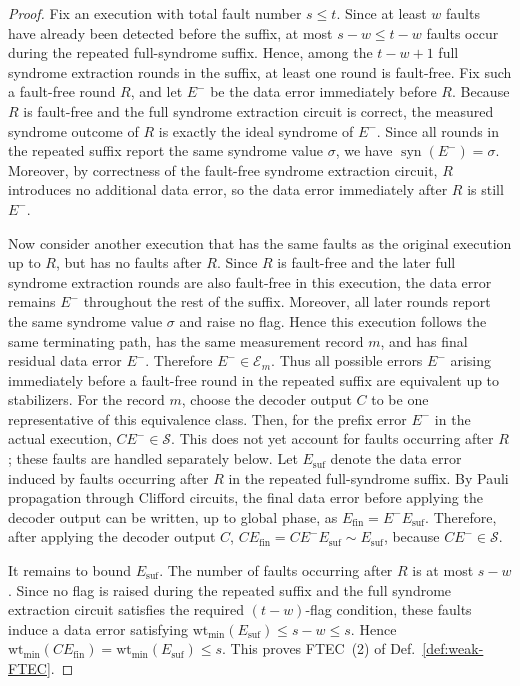 \begin{proof}
Fix an execution with total fault number $s\le t$.  Since at least $w$ faults
have already been detected before the suffix, at most $s-w\le t-w$ faults occur
during the repeated full-syndrome suffix.  Hence, among the $t-w+1$ full
syndrome extraction rounds in the suffix, at least one round is fault-free.
Fix such a fault-free round $R$, and let $E^-$ be the data error immediately
before $R$.
Because $R$ is fault-free and the full syndrome extraction circuit is correct,
the measured syndrome outcome of $R$ is exactly the ideal syndrome of $E^-$.
Since all rounds in the repeated suffix report the same syndrome value
$\sigma$, we have
$\operatorname{syn}(E^-)=\sigma$.
Moreover, by correctness of the fault-free syndrome extraction circuit, $R$
introduces no additional data error, so the data error immediately after $R$ is
still $E^-$.

Now consider
another execution that has the same faults as the original execution up to $R$,
but has no faults after $R$.  Since $R$ is fault-free and the later full
syndrome extraction rounds are also fault-free in this execution, the data
error remains $E^-$ throughout the rest of the suffix.  Moreover, all later
rounds report the same syndrome value $\sigma$ and raise no flag.  Hence this
execution follows the same terminating path, has the same measurement record
$m$, and has final residual data error $E^-$.  Therefore $E^-\in\mathcal E_m$.
Thus all possible errors $E^-$ arising immediately before a fault-free round
in the repeated suffix are equivalent up to stabilizers.  For the record $m$,
choose the decoder output $C$ to be one representative of this equivalence
class.  Then, for the prefix error $E^-$ in the actual execution,
$CE^- \in \mathcal S$. This does not yet account for faults occurring after $R$; these faults are
handled separately below.
Let $E_{\mathrm{suf}}$ denote the data error induced by faults occurring after
$R$ in the repeated full-syndrome suffix.  By Pauli propagation through Clifford
circuits, the final data error before applying the decoder output can be written,
up to global phase, as
$E_{\mathrm{fin}} = E^- E_{\mathrm{suf}}$.
Therefore, after applying the decoder output $C$, $C E_{\mathrm{fin}}
    =
    C E^- E_{\mathrm{suf}}
    \sim
    E_{\mathrm{suf}}$, because $CE^-\in\mathcal S$.

It remains to bound $E_{\mathrm{suf}}$. The number of faults occurring after
$R$ is at most $s-w$. Since no flag is raised during the repeated suffix and the
full syndrome extraction circuit satisfies the required $(t-w)$-flag condition,
these faults induce a data error satisfying
$\mathrm{wt}_{\min}(E_{\mathrm{suf}})\le s-w\le s$.
Hence
$\mathrm{wt}_{\min}(C E_{\mathrm{fin}})
    =
    \mathrm{wt}_{\min}(E_{\mathrm{suf}})
    \le s$.
This proves FTEC~(2) of Def.~\ref{def:weak-FTEC}.


\end{proof}

